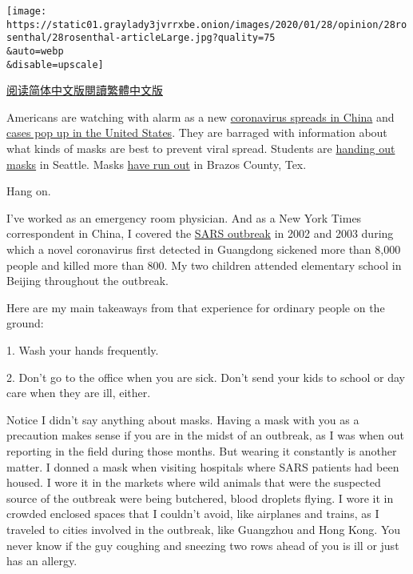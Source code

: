 \texttt{[image: https://static01.graylady3jvrrxbe.onion/images/2020/01/28/opinion/28rosenthal/28rosenthal-articleLarge.jpg?quality=75\\\&auto=webp\\\&disable=upscale]}

\href{https://cn.nytimes3xbfgragh.onion/opinion/20200131/coronavirus-prevention-tips/}{阅读简体中文版}\href{https://cn.nytimes3xbfgragh.onion/opinion/20200131/coronavirus-prevention-tips/zh-hant/}{閱讀繁體中文版}

Americans are watching with alarm as a new
\href{https://www.nytimes3xbfgragh.onion/2020/01/29/business/china-coronavirus-economy.html}{coronavirus
spreads in China} and
\href{https://www.nytimes3xbfgragh.onion/interactive/2020/world/asia/china-wuhan-coronavirus-maps.html}{cases
pop up in the United States}. They are barraged with information about
what kinds of masks are best to prevent viral spread. Students are
\href{https://www.washingtonpost.com/world/coronavirus-china-live-updates/2020/01/25/0ca57a5e-3ed7-11ea-afe2-090eb37b60b1_story.html}{handing
out masks} in Seattle. Masks
\href{https://www.kbtx.com/content/news/Local-drug-stores-out-of-face-masks-after-potential-case-of-Coronavirus-detected-567279461.html}{have
run out} in Brazos County, Tex.

Hang on.

I've worked as an emergency room physician. And as a New York Times
correspondent in China, I covered the
\href{https://www.who.int/ith/diseases/sars/en/}{SARS outbreak} in 2002
and 2003 during which a novel coronavirus first detected in Guangdong
sickened more than 8,000 people and killed more than 800. My two
children attended elementary school in Beijing throughout the outbreak.

Here are my main takeaways from that experience for ordinary people on
the ground:

1. Wash your hands frequently.

2. Don't go to the office when you are sick. Don't send your kids to
school or day care when they are ill, either.

Notice I didn't say anything about masks. Having a mask with you as a
precaution makes sense if you are in the midst of an outbreak, as I was
when out reporting in the field during those months. But wearing it
constantly is another matter. I donned a mask when visiting hospitals
where SARS patients had been housed. I wore it in the markets where wild
animals that were the suspected source of the outbreak were being
butchered, blood droplets flying. I wore it in crowded enclosed spaces
that I couldn't avoid, like airplanes and trains, as I traveled to
cities involved in the outbreak, like Guangzhou and Hong Kong. You never
know if the guy coughing and sneezing two rows ahead of you is ill or
just has an allergy.

